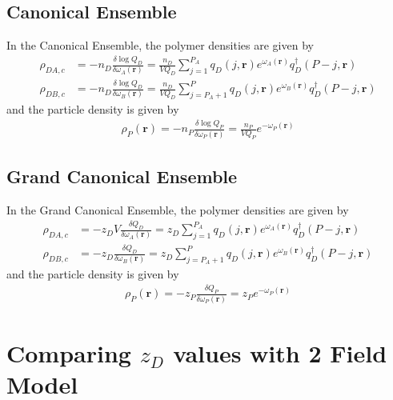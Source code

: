 \documentclass{article}
\begin{document}
\subsection{Canonical Ensemble}

In the Canonical Ensemble, the polymer densities are given by
\begin{align*}
  \rho_{DA,c} &=
    -n_D \frac{\delta \log Q_D}{\delta \omega_A(\mathbf{r})}
    = \frac{n_D}{V Q_D}
    \sum_{j=1}^{P_A}
    q_D(j, \mathbf{r})
    e^{\omega_A(\mathbf{r})}
    q_D^\dagger(P-j, \mathbf{r}) \\
  \rho_{DB,c} &=
    -n_D \frac{\delta \log Q_D}{\delta \omega_B(\mathbf{r})}
    = \frac{n_D}{V Q_D}
    \sum_{j=P_A+1}^{P}
    q_D(j, \mathbf{r})
    e^ {\omega_B(\mathbf{r})}
    q_D^\dagger(P-j, \mathbf{r})
\end{align*}
and the particle density is given by
\begin{align*}
  \rho_P(\mathbf{r}) =
    -n_P \frac{\delta \log Q_P}{\delta \omega_P(\mathbf{r})}
    = \frac{n_P}{V Q_P} e^{-\omega_P(\mathbf{r})}
\end{align*}

\subsection{Grand Canonical Ensemble}

In the Grand Canonical Ensemble, the polymer densities are given by
\begin{align*}
  \rho_{DA,c} &=
    -z_D V \frac{\delta Q_D}{\delta \omega_A(\mathbf{r})}
    = z_D
    \sum_{j=1}^{P_A}
    q_D(j, \mathbf{r})
    e^{\omega_A(\mathbf{r})}
    q_D^\dagger(P-j, \mathbf{r}) \\
  \rho_{DB,c} &=
    -z_D \frac{\delta Q_D}{\delta \omega_B(\mathbf{r})}
    = z_D
    \sum_{j=P_A+1}^{P}
    q_D(j, \mathbf{r})
    e^ {\omega_B(\mathbf{r})}
    q_D^\dagger(P-j, \mathbf{r})
\end{align*}
and the particle density is given by
\begin{align*}
  \rho_P(\mathbf{r}) =
    -z_P \frac{\delta Q_P}{\delta \omega_P(\mathbf{r})}
    = z_P e^{-\omega_P(\mathbf{r})}
\end{align*}

\section{Comparing $z_D$ values with 2 Field Model}
\end{document}

